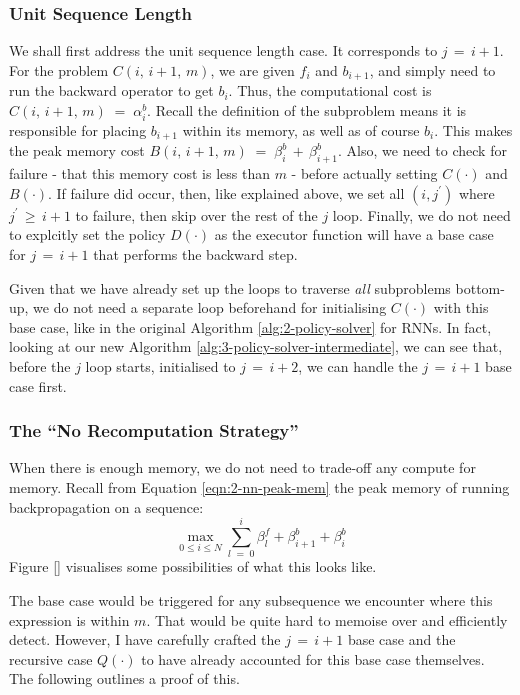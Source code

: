 \subsubsection*{Unit Sequence Length}
We shall first address the unit sequence length case.
It corresponds to \(j \,=\, i+1\).
For the problem \(C(i,\,i+1,\,m)\), we are given \(f_i\) and \(b_{i+1}\), and simply need to run the backward operator to get \(b_i\).
Thus, the computational cost is \(C(i,\,i+1,\,m) \;=\; \alpha^b_i\).
Recall the definition of the subproblem means it is responsible for placing \(b_{i+1}\) within its memory, as well as of course \(b_{i}\).
This makes the peak memory cost \(B(i,\,i+1,\,m) \;=\; \beta^b_i \,+\, \beta^b_{i+1}\).
Also, we need to check for failure - that this memory cost is less than \(m\) - before actually setting \(C(\cdot)\) and \(B(\cdot)\).
If failure did occur, then, like explained above, we set all \((i, j^\prime)\) where \(j^\prime \,\geq\, i+1\) to failure, then skip over the rest of the \(j\) loop.
Finally, we do not need to explcitly set the policy \(D(\cdot)\) as the executor function will have a base case for \(j \,=\, i+1\) that performs the backward step.

Given that we have already set up the loops to traverse \textit{all} subproblems bottom-up, we do not need a separate loop beforehand for initialising \(C(\cdot)\) with this base case, like in the original Algorithm \ref{alg:2-policy-solver} for RNNs.
In fact, looking at our new Algorithm \ref{alg:3-policy-solver-intermediate}, we can see that, before the \(j\) loop starts, initialised to \(j\,=\,i+2\), we can handle the \(j\,=\,i+1\) base case first.

\subsubsection*{The ``No Recomputation Strategy''}
When there is enough memory, we do not need to trade-off any compute for memory.
Recall from Equation \ref{eqn:2-nn-peak-mem} the peak memory of running backpropagation on a sequence:
\begin{equation*}
    \max_{0 \leq i \leq N} \sum_{l\;=\;0}^i \beta^f_l + \beta^b_{i+1} + \beta^b_i
\end{equation*}
Figure \ref{} visualises some possibilities of what this looks like.

The base case would be triggered for any subsequence we encounter where this expression is within \(m\).
That would be quite hard to memoise over and efficiently detect.
However, I have carefully crafted the \(j\,=\,i+1\) base case and the recursive case \(Q(\cdot)\) to have already accounted for this base case themselves.
The following outlines a proof of this.

